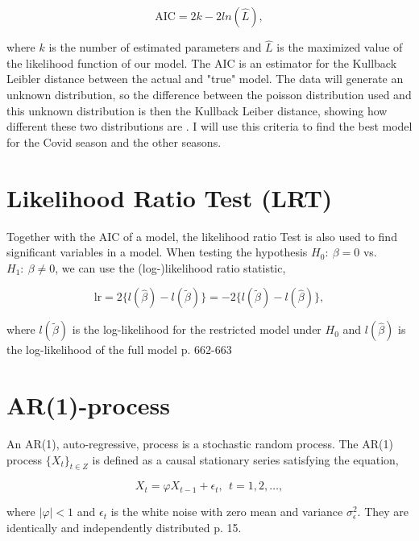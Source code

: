 \begin{equation}
\text{AIC} = 2k - 2 ln(\hat{L}),
\label{eqn:AIC}
\end{equation}

\noindent where $k$ is the number of estimated parameters and $\hat{L}$ is the maximized value of the likelihood function of our model. The AIC is an estimator for the Kullback Leibler distance between the actual and "true" model. The data will generate an unknown distribution, so the difference between the poisson distribution used and this unknown distribution is then the Kullback Leiber distance, showing how different these two distributions are \cite{kullback}. I will use this criteria to find the best model for the Covid season and the other seasons.

\newpage

\section{Likelihood Ratio Test (LRT)}

\noindent Together with the AIC of a model, the likelihood ratio Test is also used to find significant variables in a model. When testing the hypothesis $H_0: \ \beta = 0$ vs. $H_1: \ \beta \neq 0$, we can use the (log-)likelihood ratio statistic,

\begin{equation}
\text{lr} = 2\big\{ l(\hat\beta) - l(\tilde\beta) \big\} = -2\big\{ l(\tilde\beta) - l(\hat\beta) \big\},
\label{eqn:lrs}
\end{equation}

\noindent where $l(\tilde\beta)$ is the log-likelihood for the restricted model under $H_0$ and  $l(\hat\beta)$ is the log-likelihood of the full model \cite{regression} p. 662-663\\

\section{AR(1)-process}

\noindent An AR(1), auto-regressive, process is a stochastic random process. The AR(1) process $\{X_t\}_{t \in Z}$ is defined as a causal stationary series satisfying the equation,

\begin{equation}
X_t = \varphi X_{t-1} + \epsilon_t, \ \ t = 1,2,\dots,
\label{eqn:ar1}
\end{equation}

\noindent where $|\varphi| < 1$ and $\epsilon_t$ is the white noise with zero mean and variance $\sigma^2_\epsilon$. They are identically and independently distributed \cite{timeseries} p. 15.


